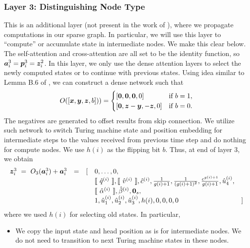 \subsubsection{Layer 3: Distinguishing Node Type}
\label{sec:appndx-new-layer}
This is an additional layer (not present in the work of \cite{Perez19}), where we propagate computations 
in our sparse graph. 
In particular, we will use this layer to ``compute'' or accumulate state in intermediate nodes. 
We make this clear below.
The self-attention and cross-attention are all set to be the identity function, so ${\bm{a}}_i^3={\bm{p}}_i^3={\bm{z}}_i^2$.
In this layer, we only use the dense attention layers to select the newly computed states or to continue 
with previous states.
Using idea similar to Lemma B.6 of \citep{Perez19}, we can construct a dense network such that
\[
O([\vx,\vy,\vz,b])) = 
\begin{cases} 
[\vzero,\vzero,\vzero,0] & \text{if }b=1, \\
[\vzero,\vz-\vy,-\vz,0] & \text{if }b=0.
\end{cases} 
\]
The negatives are generated to offset results from skip connection. 
We utilize such network to switch Turing machine state and position embedding for intermediate steps to the values received from previous time step and do nothing for compute nodes. 
We use $h(i)$ as the flipping bit $b$.
Thus, at end of layer 3, we obtain
\begin{equation*}
\begin{array}{rcllr}
{\bm{z}}^3_i \ = \ O_3({\bm{a}}^3_i) + {\bm{a}}^3_i & = & [ 
& 0,\ldots,0, \\
&&& \llbracket\ \hat{q}^{(i)}\ \rrbracket,\llbracket\ \hat{v}^{(i)}\ \rrbracket,\hat{c}^{(i)},\frac{1}{g(i)+1},\frac{1}{(g(i)+1)^2},\frac{c^{g(i)+1}}{g(i)+1},\hat{u}_4^{(i)}, \\
&&& \llbracket\ \hat{\alpha}^{(i)}\ \rrbracket,\hat{\beta}^{(i)},{\bm{0}}_s, \\
&&& 1,\hat{u}_1^{(i)},\hat{u}_2^{(i)},\hat{u}_3^{(i)},h(i),0,0,0,0 & ] 
\end{array}
\end{equation*}
where we used $h(i)$ for selecting old states. In particular,
\vspace{-3mm}
\begin{itemize}[leftmargin=6mm, itemsep=2mm, partopsep=0mm,parsep=0mm]
    \item We copy the input state and head position as is for intermediate nodes. We do not need to transition to next Turing machine states in these nodes.
\end{itemize}

